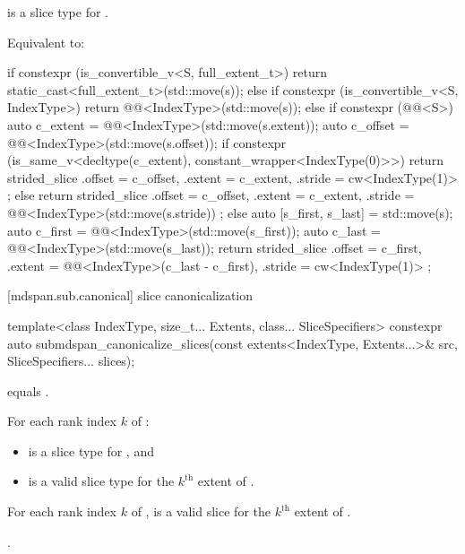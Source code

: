 \begin{itemdescr}
\pnum
\mandates
{} is a  slice type for .

\pnum
\effects
Equivalent to:
\begin{codeblock}
if constexpr (is_convertible_v<S, full_extent_t>) {
  return static_cast<full_extent_t>(std::move(s));
} else if constexpr (is_convertible_v<S, IndexType>) {
  return @@<IndexType>(std::move(s));
} else if constexpr (@@<S>) {
  auto c_extent = @@<IndexType>(std::move(s.extent));
  auto c_offset = @@<IndexType>(std::move(s.offset));
  if constexpr (is_same_v<decltype(c_extent), constant_wrapper<IndexType(0)>>) {
    return strided_slice{
      .offset = c_offset,
      .extent = c_extent,
      .stride = cw<IndexType(1)>
    };
  } else {
    return strided_slice{
      .offset = c_offset,
      .extent = c_extent,
      .stride = @@<IndexType>(std::move(s.stride))
    };
  }
} else {
  auto [s_first, s_last] = std::move(s);
  auto c_first = @@<IndexType>(std::move(s_first));
  auto c_last  = @@<IndexType>(std::move(s_last));
  return strided_slice{
    .offset = c_first,
    .extent = @@<IndexType>(c_last - c_first),
    .stride = cw<IndexType(1)>
  };
}
\end{codeblock}
\end{itemdescr}

[mdspan.sub.canonical]{ slice canonicalization}

%
\begin{itemdecl}
template<class IndexType, size_t... Extents, class... SliceSpecifiers>
  constexpr auto submdspan_canonicalize_slices(const extents<IndexType, Extents...>& src,
                                               SliceSpecifiers... slices);
\end{itemdecl}

\begin{itemdescr}
\pnum
\constraints
{} equals .

\pnum
\mandates
For each rank index $k$ of :
\begin{itemize}
\item
  is a  slice type for , and
\item
  is a valid  slice type for the $k^\text{th}$ extent of
  .
\end{itemize}

\pnum
\expects
For each rank index $k$ of ,
is a valid  slice for the $k^\text{th}$ extent of .

\pnum
\returns
{}.
\end{itemdescr}

